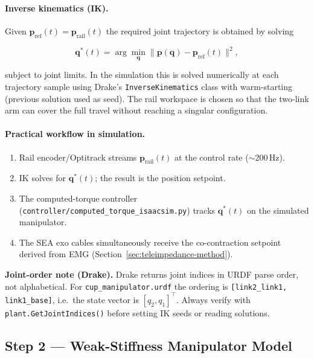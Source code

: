 \documentclass[11pt, a4paper]{article}
\newcommand{\bq}{\bm{q}}
\begin{document}
\paragraph{Inverse kinematics (IK).}
Given $\bm{p}_{\text{ref}}(t) = \bm{p}_{\text{rail}}(t)$ the required
joint trajectory is obtained by solving

\[
  \bq^*(t) = \arg\min_{\bq} \|\bm{p}(\bq) - \bm{p}_{\text{ref}}(t)\|^2,
\]

subject to joint limits.  In the simulation this is solved numerically at
each trajectory sample using Drake's \texttt{InverseKinematics} class
with warm-starting (previous solution used as seed).  The rail workspace
is chosen so that the two-link arm can cover the full travel without
reaching a singular configuration.

\paragraph{Practical workflow in simulation.}
\begin{enumerate}[nosep]
  \item Rail encoder/Optitrack streams
        $\bm{p}_{\text{rail}}(t)$ at the control rate ($\sim$200\,Hz).
  \item IK solves for $\bq^*(t)$; the result is the position setpoint.
  \item The computed-torque controller
        (\texttt{controller/computed\_torque\_isaacsim.py}) tracks
        $\bq^*(t)$ on the simulated manipulator.
  \item The SEA exo cables simultaneously receive the co-contraction
        setpoint derived from EMG (Section~\ref{sec:teleimpedance-method}).
\end{enumerate}

\begin{warnbox}
  \textbf{Joint-order note (Drake).}  Drake returns joint indices in URDF
  parse order, not alphabetical.  For \texttt{cup\_manipulator.urdf} the
  ordering is \texttt{[link2\_link1, link1\_base]}, i.e.\ the state vector is
  $[q_2, q_1]^\top$.  Always verify with \texttt{plant.GetJointIndices()} before
  setting IK seeds or reading solutions.
\end{warnbox}

\subsection{Step 2 --- Weak-Stiffness Manipulator Model}
\end{document}
